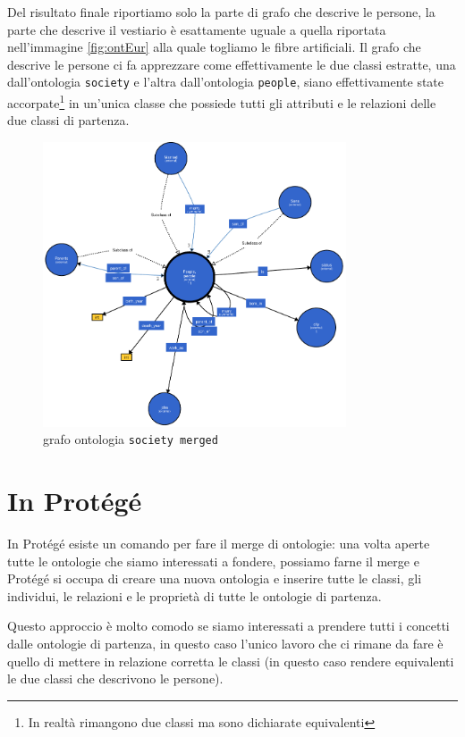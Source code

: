 Del risultato finale riportiamo solo la parte di grafo che descrive le persone, la parte che descrive il vestiario è esattamente uguale a quella riportata nell'immagine \ref{fig:ontEur} alla quale togliamo le fibre artificiali. Il grafo che descrive le persone ci fa apprezzare come effettivamente le due classi estratte, una dall'ontologia \verb|society| e l'altra dall'ontologia \verb|people|, siano effettivamente state accorpate\footnote{In realtà rimangono due classi ma sono dichiarate equivalenti} in un'unica classe che possiede tutti gli attributi e le relazioni delle due classi di partenza.
\begin{figure}[H]
	\centering
	\includegraphics[width=0.8\textwidth]{Picture/society_merged.rdf.pdf}
	\caption{grafo ontologia \texttt{society merged}}
\end{figure}

\section{In Protégé}
In Protégé esiste un comando per fare il merge di ontologie: una volta aperte tutte le ontologie che siamo interessati a fondere, possiamo farne il merge e Protégé si occupa di creare una nuova ontologia e inserire tutte le classi, gli individui, le relazioni e le proprietà di tutte le ontologie di partenza. 

Questo approccio è molto comodo se siamo interessati a prendere tutti i concetti dalle ontologie di partenza, in questo caso l'unico lavoro che ci rimane da fare è quello di mettere in relazione corretta le classi (in questo caso rendere equivalenti le due classi che descrivono le persone). 

